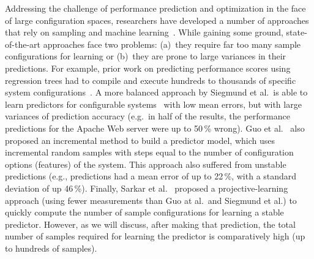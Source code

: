 Addressing the challenge of performance prediction and optimization in the face of large configuration spaces, researchers have developed a number of approaches that rely on sampling and machine learning~\cite{siegmund2012predicting,guo2013variability,sarkar2015cost}.
While gaining some ground, state-of-the-art approaches face two problems: 
(a)~they require far too many sample configurations for learning or (b)~they are prone to large variances in their predictions. For example, prior work on predicting performance scores using regression trees had to compile and execute hundreds to thousands of specific system configurations~\cite{guo2013variability}. 
A more balanced approach by Siegmund et al.\ is able to learn predictors for  configurable systems~\cite{siegmund2012predicting} with low mean errors, but with large variances of prediction accuracy  (e.g.\ in half of the results, the performance predictions for the Apache Web server were up to 50\,\% wrong). 
Guo et al.~\cite{guo2013variability} also proposed an incremental method to build a predictor model, which uses incremental random samples with steps equal to the number of configuration options (features) of the system. This approach also
suffered from  unstable predictions (e.g., predictions had a mean error of up to 22\,\%, with a standard deviation of up 46\,\%). Finally, Sarkar et al.~\cite{sarkar2015cost} proposed a proj\-ective-learning approach (using fewer measurements than Guo at al.\ and Siegmund et al.) to quickly compute  the number of sample configurations for learning a stable predictor. However, as we will discuss, after making that prediction, the total number of samples required for learning the predictor is comparatively high (up to hundreds of samples).


